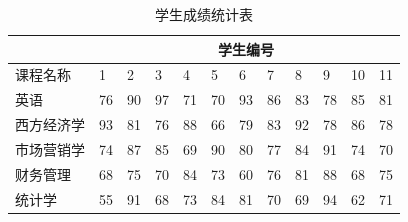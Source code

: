 \begin{table}[!ht]
\centering
\caption{学生成绩统计表}
\begin{tabular}{|l|l|l|l|l|l|l|l|l|l|l|l|}
\hline
&\multicolumn{11}{c|}{学生编号}  \\\hline
课程名称 & 1 & 2 & 3 & 4 & 5 & 6 & 7 & 8 & 9 & 10 & 11 \\ \hline
英语 & 76 & 90 & 97 & 71 & 70 & 93 & 86 & 83 & 78 & 85 & 81 \\ \hline
西方经济学 & 93 & 81 & 76 & 88 & 66 & 79 & 83 & 92 & 78 & 86 & 78 \\ \hline
市场营销学 & 74 & 87 & 85 & 69 & 90 & 80 & 77 & 84 & 91 & 74 & 70 \\ \hline
财务管理 & 68 & 75 & 70 & 84 & 73 & 60 & 76 & 81 & 88 & 68 & 75 \\ \hline
统计学 & 55 & 91 & 68 & 73 & 84 & 81 & 70 & 69 & 94 & 62 & 71 \\ \hline

\end{tabular}
\end{table}
